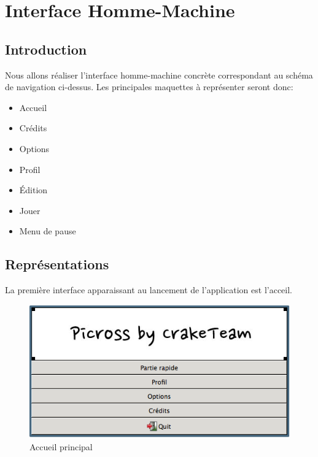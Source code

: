 \documentclass[11pt]{article}
\begin{document}

\newpage

\section{Interface Homme-Machine}
	\subsection{Introduction}
	Nous allons réaliser l'interface homme-machine concrète correspondant au schéma de navigation ci-dessus. Les principales maquettes à représenter seront donc:
	\begin{itemize}
		\item Accueil
		\item Crédits
		\item Options
		\item Profil
		\item Édition
		\item Jouer
		\item Menu de pause
	\end{itemize}
	
	\subsection{Représentations}
	La première interface apparaissant au lancement de l'application est l'acceil.
	
		\begin{figure}[!ht]
			\centering
			\includegraphics{./IHM/accueil.png}
			\caption{Accueil principal}
		\end{figure}
		
	\FloatBarrier
		
\end{document}
